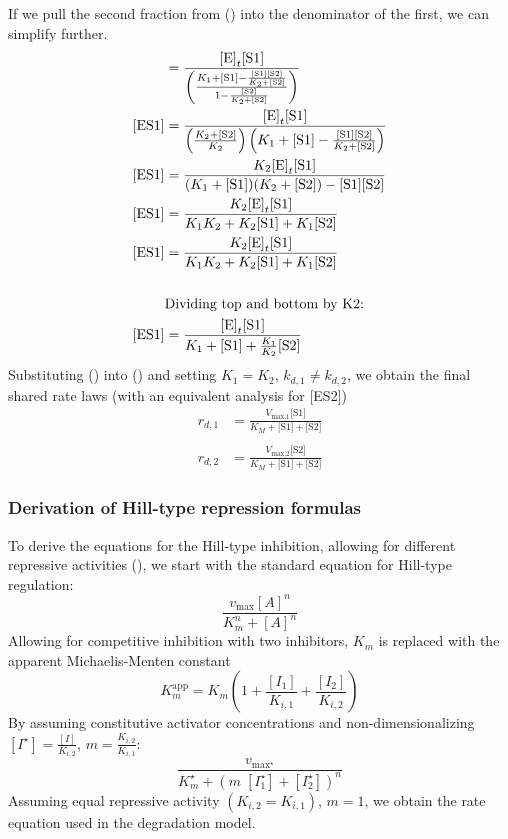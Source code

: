 If we pull the second fraction from () into the denominator of the first, we can simplify further.
\begin{align}
  [\text{ES1}] &= \frac{\text{[E]}_t \text{[S1]}}{\left(\frac{K_1 + \text{[S1]} - \frac{\text{[S1]} \text{[S2]}}{K_2 + \text{[S2]}}}{1 - \frac{\text{[S2]}}{K_2 + \text{[S2]}}}\right)} \notag\\
  [\text{ES1}] &= \frac{\text{[E]}_t \text{[S1]}}{\left(\frac{K_2 + \text{[S2]}}{K_2}\right) \left(K_1 + \text{[S1]} - \frac{\text{[S1]} \text{[S2]}}{K_2 + \text{[S2]}}\right)} \notag\\
  [\text{ES1}] &= \frac{K_2 \text{[E]}_t \text{[S1]}}{(K_1 + \text{[S1]})(K_2 + \text{[S2]}) - \text{[S1]}\text{[S2]}} \notag\\
  [\text{ES1}] &= \frac{K_2 \text{[E]}_t \text{[S1]}}{K_1 K_2 + K_2\text{[S1]} + K_1\text{[S2]}} \notag\\
  [\text{ES1}] &= \frac{K_2 \text{[E]}_t \text{[S1]}}{K_1 K_2 + K_2\text{[S1]} + K_1\text{[S2]}} \notag\\ \notag\\
  & \text{Dividing top and bottom by K2:} \notag\\
  [\text{ES1}] &= \frac{\text{[E]}_t \text{[S1]}}{K_1 + \text{[S1]} + \frac{K_1}{K_2}\text{[S2]}}\label{eq:es1}
\end{align}
Substituting () into () and setting $K_1 = K_2$, $k_{d,1} \neq k_{d,2}$, we obtain the final shared rate laws (with an equivalent analysis for [ES2])
\begin{align*}
  r_{d,1} &= \frac{V_\text{max,1} \text{[S1]}}{K_M + \text{[S1]} + \text{[S2]}} \\ \\
  r_{d,2} &= \frac{V_\text{max,2} \text{[S2]}}{K_M + \text{[S1]} + \text{[S2]}}
\end{align*}

\subsubsection{Derivation of Hill-type repression formulas}
To derive the equations for the Hill-type inhibition, allowing for different repressive activities (), we start with the standard equation for Hill-type regulation:
\begin{equation} \label{eq:htr}
  \frac{v_{\text{max}}[A]^n}{K_m^n + [A]^n}
\end{equation}
Allowing for competitive inhibition with two inhibitors, $K_m$ is replaced with the apparent Michaelis-Menten constant
\begin{equation}\label{eq:kmapp}
  K_m^{\text{app}} = K_m \left(1 + \frac{[I_1]}{K_{i,1}} + \frac{[I_2]}{K_{i,2}}\right)
\end{equation}
By assuming constitutive activator concentrations and non-dimensionalizing $[I^{\star}] = \frac{[I]}{K_{i,2}}$, $m = \frac{K_{i,2}}{K_{i,1}}$:
\begin{equation*}
  \frac{v_{\text{max}^{\star}}}{K_m^{\star} + \left(m \; [I^{\star}_1] + [I^{\star}_2]\right)^n}
\end{equation*}
Assuming equal repressive activity $(K_{i,2} = K_{i,1})$, $m = 1$, we obtain the rate equation used in the degradation model.


